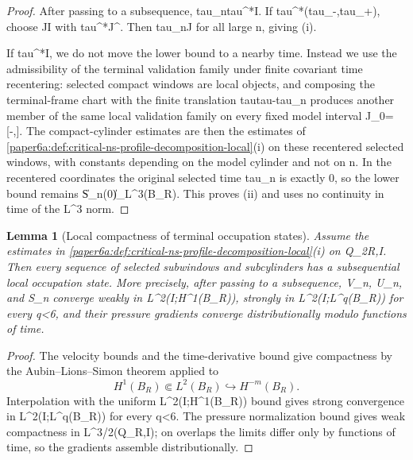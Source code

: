 \documentclass[11pt]{amsart}
\def\({}%
\def\){}%
\def\tau{tau}%
\theoremstyle{plain}
\newtheorem{lemma}[lemma]{Lemma}
\theoremstyle{definition}
\theoremstyle{remark}
\begin{document}
\begin{proof}
After passing to a subsequence, \(\tau_n\to\tau^*\in I\).  If
\(\tau^*\in(\tau_-,\tau_+)\), choose \(J\Subset I\) with
\(\tau^*\in J^\circ\).  Then \(\tau_n\in J\) for all large \(n\), giving
\textup{(i)}.

If \(\tau^*\in\partial I\), we do not move the lower bound to a nearby time.
Instead we use the admissibility of the terminal validation family under finite
covariant time recentering: selected compact windows are local objects, and
composing the terminal-frame chart with the finite translation
\(\tau\mapsto\tau-\tau_n\) produces another member of the same local validation
family on every fixed model interval \(J_0=[-\sigma,\sigma]\).  The
compact-cylinder estimates are then the estimates of
\cref{paper6a:def:critical-ns-profile-decomposition-local}\textup{(i)} on these
recentered selected windows, with constants depending on the model cylinder
and not on \(n\).  In the recentered coordinates the original selected time
\(\tau_n\) is exactly \(0\), so the lower bound remains
\(\|S_n(0)\|_{L^3(B_R)}\ge\delta\).  This proves \textup{(ii)} and uses no
continuity in time of the \(L^3\) norm.
\end{proof}

\begin{lemma}[Local compactness of terminal occupation states]
\label{paper6a:lem:l3-profile-extraction-cited}
Assume the estimates in
\cref{paper6a:def:critical-ns-profile-decomposition-local}\textup{(i)} on
\(Q_{2R,I}\).  Then every sequence of selected subwindows and subcylinders has
a subsequential local occupation state.  More precisely, after passing to a
subsequence, \(V_n\), \(U_n\), and \(S_n\) converge weakly in
\(L^2(I;H^1(B_R))\), strongly in \(L^2(I;L^q(B_R))\) for every \(q<6\), and
their pressure gradients converge distributionally modulo functions of time.
\end{lemma}

\begin{proof}
The velocity bounds and the time-derivative bound give compactness by the
Aubin--Lions--Simon theorem applied to
\[
  H^1(B_R)\Subset L^2(B_R)\hookrightarrow H^{-m}(B_R).
\]
Interpolation with the uniform \(L^2(I;H^1(B_R))\) bound gives strong
convergence in \(L^2(I;L^q(B_R))\) for every \(q<6\).  The pressure
normalization bound gives weak compactness in \(L^{3/2}(Q_{R,I})\); on overlaps
the limits differ only by functions of time, so the gradients assemble
distributionally.
\end{proof}
\end{document}
